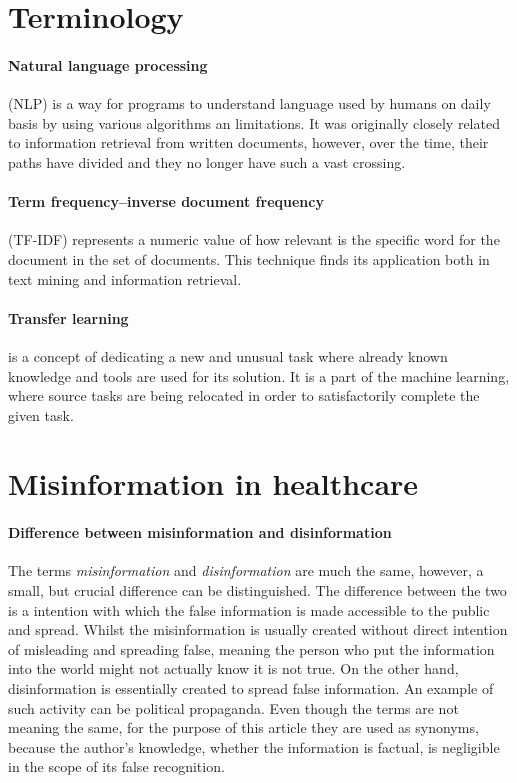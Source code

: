\documentclass[11pt ,english,a4paper]{article}
\begin{document}
\section{Terminology}\label{ter}

\paragraph{Natural language processing} (NLP) is a way for programs to understand language used by humans on daily basis by using various algorithms an limitations. It was originally closely related to information retrieval from written documents, however, over the time, their paths have divided and they no longer have such a vast crossing. \cite{nad11natural}\cite{lid01natural}

\paragraph{Term frequency–inverse document frequency} (TF-IDF) represents a numeric value of how relevant is the specific word for the document in the set of documents. This technique finds its application both in text mining and information retrieval. \cite{chr16tfidf}  

\paragraph{Transfer learning} is a concept of dedicating a new and unusual task where already known knowledge and tools are used for its solution. It is a part of the machine learning, where source tasks are being relocated in order to satisfactorily complete the given task. \cite{chap22unmask}\cite{tor10transfer}

\section{Misinformation in healthcare}\label{mih}

\paragraph{Difference between misinformation and disinformation}
The terms \emph{misinformation} and \emph{disinformation} are much the same, however, a small, but crucial difference can be distinguished. The difference between the two is a intention with which the false information is made accessible to the public and spread. Whilst the misinformation is usually created without direct intention of misleading and spreading false, meaning the person who put the information into the world might not actually know it is not true. On the other hand, disinformation is essentially created to spread false information. An example of such activity can be political propaganda.\cite{gu20misinfo} \cite{cook15misinfo} Even though the terms are not meaning the same, for the purpose of this article they are used as synonyms, because the author's knowledge, whether the information is factual, is negligible in the scope of its false recognition.
\end{document}
